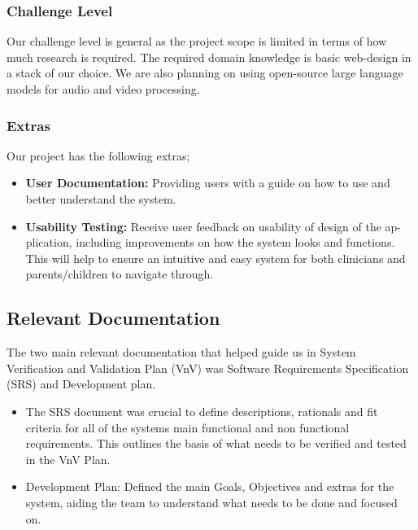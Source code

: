 \documentclass[12pt, titlepage]{article}
\begin{document}
\subsubsection{Challenge Level} 

Our challenge level is general as the project scope is limited in terms of how much
research is required. The required domain knowledge is basic web-design in a
stack of our choice. We are also planning on using open-source large language
models for audio and video processing.

\subsubsection{Extras}
Our project has the following extras;
\begin{itemize}
  \item \textbf{User Documentation: } Providing users with a guide on how to use and
  better understand the system. 
  \item \textbf{Usability Testing: } Receive user feedback on usability of design of the ap-
plication, including improvements on how the system looks and functions. This will help to ensure an intuitive and easy system for both clinicians and parents/children to navigate through.
\end{itemize}


\subsection{Relevant Documentation}


  The two main relevant documentation that helped guide us in System Verification and Validation Plan (VnV) was Software Requirements Specification
  (SRS) and Development plan.  
  
  \begin{itemize}
    \item The SRS document was crucial to define descriptions, rationals and fit criteria for all of the systems main functional and non functional requirements. This outlines the basis of what needs to be verified and tested in the VnV Plan. 
    \item Development Plan: Defined the main Goals, Objectives and extras for the system, aiding the team to understand what needs to be done and focused on. 
  \end{itemize}
  
\end{document}
